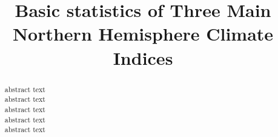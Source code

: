 \documentclass[draft,grl]{AGUTeX}
\begin{document}

\title{Basic statistics of Three Main Northern Hemisphere Climate Indices}





\begin{abstract}
          
abstract text\\
abstract text\\
abstract text\\
abstract text\\
abstract text

\end{abstract}

\end{document}
